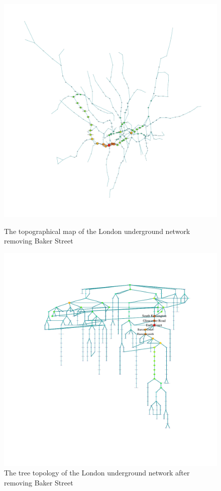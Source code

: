 \documentclass[a4paper,reqno,]{article}
\begin{document}
\begin{figure}[H]
\centering
\begin{minipage}[b]{0.49\textwidth}
\centering
    \captionsetup{width=.9\linewidth}
    \includegraphics[clip, trim=3cm 3cm 3cm 2cm,width=1\textwidth]{images/NW/3_1.pdf}
    \caption{The topographical map of the London underground network removing Baker Street}\label{fig: 3_1}
\end{minipage}
\begin{minipage}[b]{0.5\textwidth}
\centering
    \captionsetup{width=.9\linewidth}
    \includegraphics[clip, trim=3cm 3cm 3cm 2cm,width=1\textwidth]{images/NW/3_2.pdf}
    \caption{The tree topology of the London underground network after removing Baker Street}\label{fig: 3_2}
\end{minipage}
\end{figure} 
\end{document}

